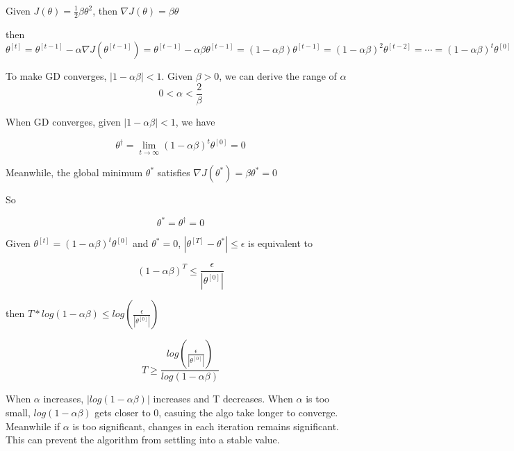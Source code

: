 \begin{answer}

Given $J(\theta) = \frac{1}{2}\beta\theta^2$, then $\nabla J(\theta) = \beta \theta$

then $\theta^{[t]} = \theta^{[t-1]} - \alpha\nabla J(\theta^{[t-1]}) = \theta^{[t-1]} - \alpha \beta \theta^{[t-1]} = (1 - \alpha \beta)\theta^{[t-1]} = (1 - \alpha \beta) ^ 2 \theta^{[t-2]} = \cdots = (1 - \alpha \beta) ^ t \theta ^{[0]}$

To make GD converges, $|1 - \alpha \beta| < 1$. Given $\beta > 0$,  we can derive the range of $\alpha$
\begin{equation*}
	0 < \alpha < \frac{2}{\beta}
\end{equation*}

When GD converges, given $|1 - \alpha \beta| < 1$, we have 

\begin{equation*}
	\theta^\dagger = \lim_{t\to\infty} (1 - \alpha \beta) ^ t \theta ^{[0]} = 0
\end{equation*}

Meanwhile, the global minimum $\theta^*$ satisfies $\nabla J(\theta^*) = \beta \theta^* = 0$

So 

\begin{equation*}
	\theta^* = \theta ^ \dagger = 0
\end{equation*}

Given $\theta^{[t]} = (1 - \alpha \beta) ^ t \theta ^{[0]}$ and $\theta ^* = 0$, $|\theta^{[T]} - \theta^*| \le \epsilon$ is equivalent to

\begin{equation*}
	 (1 - \alpha \beta) ^ T \le \frac{\epsilon}{|\theta ^{[0]}|}
\end{equation*}

then $T*log(1- \alpha\beta) \le log(\frac{\epsilon}{|\theta ^{[0]}|})$ 

\begin{equation*}
	 T \ge \frac{log(\frac{\epsilon}{|\theta ^{[0]}|})}{log(1- \alpha\beta)} 
\end{equation*}

When $\alpha$ increases, $|log(1- \alpha\beta)|$ increases and T decreases. 
When $\alpha$ is too small, $log(1 - \alpha\beta)$ gets closer to 0, casuing the algo take longer to converge.
Meanwhile if $\alpha$ is too significant, changes in each iteration remains significant. This can prevent the algorithm from settling into a stable value.

\end{answer}
